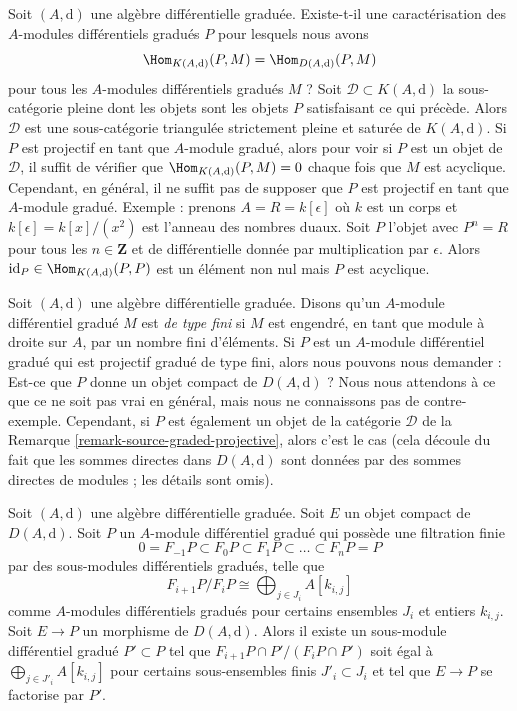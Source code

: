 \begin{remark}
\label{remark-source-graded-projective}
Soit $(A, \text{d})$ une algèbre différentielle graduée. Existe-t-il une
caractérisation des $A$-modules différentiels gradués $P$ pour lesquels nous
avons
$$
\Hom_{K(A, \text{d})}(P, M) =  \Hom_{D(A, \text{d})}(P, M)
$$
pour tous les $A$-modules différentiels gradués $M$ ? Soit $\mathcal{D}
\subset K(A, \text{d})$ la sous-catégorie pleine dont les objets sont les objets
$P$ satisfaisant ce qui précède. Alors $\mathcal{D}$ est une sous-catégorie
triangulée strictement pleine et saturée de $K(A, \text{d})$. Si $P$ est projectif
en tant que $A$-module gradué, alors pour voir si $P$ est un objet de
$\mathcal{D}$, il suffit de vérifier que $\Hom_{K(A, \text{d})}(P, M) = 0$ chaque
fois que $M$ est acyclique. Cependant, en général, il ne suffit pas de supposer
que $P$ est projectif en tant que $A$-module gradué. Exemple : prenons $A = R =
k[\epsilon]$ où $k$ est un corps et $k[\epsilon] = k[x]/(x^2)$ est l'anneau des
nombres duaux. Soit $P$ l'objet avec $P^n = R$ pour tous les $n \in \mathbf{Z}$
et de différentielle donnée par multiplication par $\epsilon$. Alors $\text{id}_P \in
\Hom_{K(A, \text{d})}(P, P)$ est un élément non nul mais $P$ est acyclique.
\end{remark}

\begin{remark}
\label{remark-graded-projective-is-compact}
Soit $(A, \text{d})$ une algèbre différentielle graduée. Disons qu'un $A$-module
différentiel gradué $M$ est {\it de type fini} si $M$ est engendré, en tant que module à
droite sur $A$, par un nombre fini d'éléments. Si $P$ est un $A$-module différentiel
gradué qui est projectif gradué de type fini, alors nous pouvons nous demander : Est-ce que $P$
donne un objet compact de $D(A, \text{d})$ ? Nous nous attendons à ce que ce ne
soit pas vrai en général, mais nous ne connaissons pas de contre-exemple.
Cependant, si $P$ est également un objet de la catégorie $\mathcal{D}$ de la
Remarque \ref{remark-source-graded-projective}, alors c'est le cas (cela découle
du fait que les sommes directes dans $D(A, \text{d})$ sont données par des sommes
directes de modules ; les détails sont omis).
\end{remark}

\begin{lemma}
\label{lemma-factor-through-nicer}
Soit $(A, \text{d})$ une algèbre différentielle graduée. Soit $E$ un objet compact
de $D(A, \text{d})$. Soit $P$ un $A$-module différentiel gradué qui possède une
filtration finie
$$
0 = F_{-1}P \subset F_0P \subset F_1P \subset \ldots \subset F_nP = P
$$
par des sous-modules différentiels gradués, telle que
$$
F_{i + 1}P/F_iP \cong \bigoplus\nolimits_{j \in J_i} A[k_{i, j}]
$$
comme $A$-modules différentiels gradués pour certains ensembles $J_i$ et
entiers $k_{i, j}$. Soit $E \to P$ un morphisme de $D(A, \text{d})$. Alors il
existe un sous-module différentiel gradué $P' \subset P$ tel que $F_{i + 1}P \cap
P'/(F_iP \cap P')$ soit égal à $\bigoplus_{j \in J'_i} A[k_{i, j}]$ pour certains
sous-ensembles finis $J'_i \subset J_i$ et tel que $E \to P$ se factorise par
$P'$.
\end{lemma}

